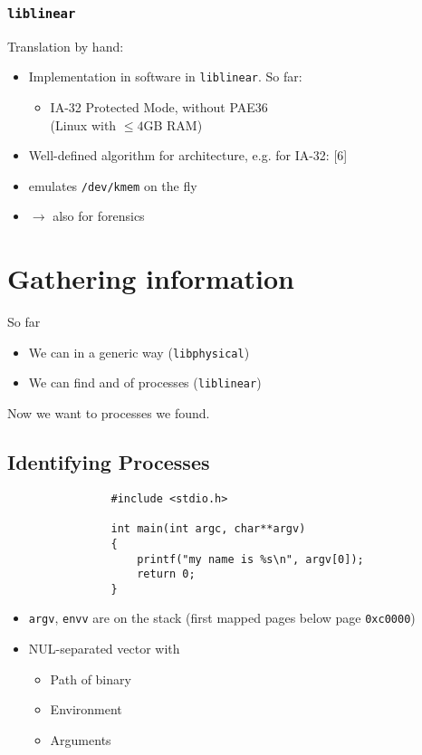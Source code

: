 \documentclass{beamer}
\begin{document}
		\begin{frame}
			\frametitle{\texttt{liblinear}}

			Translation by hand:
			\begin{itemize}
				\item Implementation in software in \texttt{liblinear}. So far:
				\begin{itemize}
					\item IA-32 Protected Mode, without PAE36 \\ (Linux with $\leq 4$GB RAM)
				\end{itemize}
				\item Well-defined algorithm for architecture, e.g. for IA-32: [6]
				\item emulates \texttt{/dev/kmem} on the fly
				\item $\rightarrow$ also for forensics
			\end{itemize}
		\end{frame}

\section{Gathering information}

	\begin{frame}
		So far
		\begin{itemize}
			\item We can  in a generic way (\texttt{libphysical})
			\item We can find and  of processes (\texttt{liblinear})
		\end{itemize}
		Now we want to  processes we found.
	\end{frame}

	\subsection{Identifying Processes}
	
		\begin{frame}[fragile]
			\begin{verbatim}
				#include <stdio.h>

				int main(int argc, char**argv)
				{
				    printf("my name is %s\n", argv[0]);
				    return 0;
				}
			\end{verbatim}
			\begin{itemize}
				\item \texttt{argv}, \texttt{envv} are on the stack (first mapped pages below page \texttt{0xc0000})
				\item NUL-separated vector with
				\begin{itemize}
					\item Path of binary
					\item Environment
					\item Arguments
				\end{itemize}
			\end{itemize}
		\end{frame}
\end{document}
